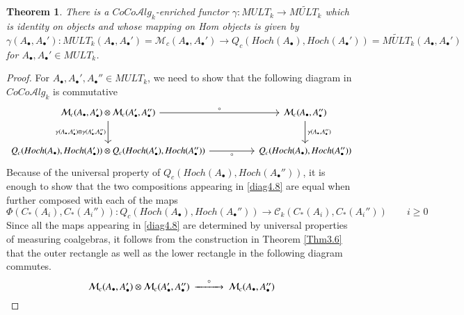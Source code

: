 \documentclass[10pt, colorlinks]{article}
\numberwithin{equation}{section} \DeclareMathSizes{2}{10}{12}{13}
\newtheorem{Thm}[thm]{Theorem}
\begin{document}
    
    \begin{Thm}\label{thm4.5}
        There is a $CoCo\mathcal Alg_k$-enriched functor $\gamma: MULT_k\longrightarrow \widetilde{MULT_k}$ which is identity on objects and whose mapping on Hom objects is given by 
        \begin{equation*}
            \gamma(A_\bullet,A_\bullet'):MULT_k(A_\bullet,A_\bullet')=\mathcal M_c(A_\bullet,A_\bullet')\longrightarrow Q_c(Hoch(A_\bullet), Hoch(A_\bullet'))=\widetilde{MULT}_k(A_\bullet,A_\bullet')
        \end{equation*}
        for $A_\bullet,A_\bullet'\in MULT_k$.
    \end{Thm}



    
    \begin{proof}
        For  $A_\bullet,A_\bullet',A_\bullet''\in MULT_k$, we need to show that the  following diagram in  $CoCo\mathcal Alg_k$   is commutative
         \begin{equation}\label{diag4.8}
            \begin{tikzcd}[row sep=2.5em,  column sep=5em]
            \mathcal M_c(A_\bullet,A_\bullet')\otimes \mathcal M_c(A'_\bullet,A_\bullet'')
  \arrow[r, "\circ"]
  \arrow[d, "{\gamma(A_\bullet,A_\bullet')\otimes \gamma(A_\bullet',A_\bullet'')} "']
&
\mathcal M_c(A_\bullet,A_\bullet'')
  \arrow[d, "{\gamma(A_\bullet,A_\bullet'')}"]
\\
Q_c(Hoch(A_\bullet), Hoch(A_\bullet'))\otimes Q_c(Hoch(A_\bullet'), Hoch(A_\bullet''))
  \arrow[r,"\circ"']
&
Q_c(Hoch(A_\bullet), Hoch(A_\bullet''))
\end{tikzcd}
        \end{equation}
        Because of the universal property of $Q_c(Hoch(A_\bullet), Hoch(A_\bullet''))$, it is enough to show that the two compositions appearing in  \eqref{diag4.8} are equal when further composed with each of the maps  
\begin{equation} \Phi(C_*(A_i),C_*(A_i'')): Q_c(Hoch(A_\bullet), Hoch(A_\bullet''))\longrightarrow \mathcal C_k(C_*(A_i),C_*(A_i''))\qquad i\geq 0
\end{equation} Since all the maps appearing in \eqref{diag4.8} are determined by universal properties of measuring coalgebras, it follows  from the construction in Theorem \ref{Thm3.6} that the outer rectangle as well as the lower rectangle in the following diagram commutes.
\begin{equation}\label{rect412}
\begin{CD}
  \mathcal M_c(A_\bullet,A_\bullet')\otimes \mathcal M_c(A'_\bullet,A_\bullet'') @>\circ>> \mathcal M_c(A_\bullet,A_\bullet'')\\

\end{CD}
\end{equation}
\end{proof}
\end{document}

